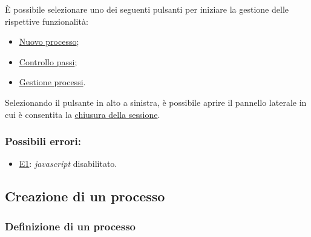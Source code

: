 È possibile selezionare uno dei seguenti pulsanti per iniziare la gestione delle rispettive funzionalità:
\begin{itemize}
\item  \hyperref[creazione]{Nuovo processo};
\item  \hyperref[controllo]{Controllo passi};
\item  \hyperref[gestione]{Gestione processi}.
\end{itemize}

Selezionando il pulsante in alto a sinistra, è possibile aprire il pannello laterale in cui è consentita la \hyperref[logout]{chiusura della sessione}.

\subsubsection*{Possibili errori:}
\begin{itemize}
\item \hyperref[e1]{E1}: \textit{javascript} disabilitato.
\end{itemize}

\subsection{Creazione di un processo}
\label{creazione}

\subsubsection{Definizione di un processo}
\label{definizione}

